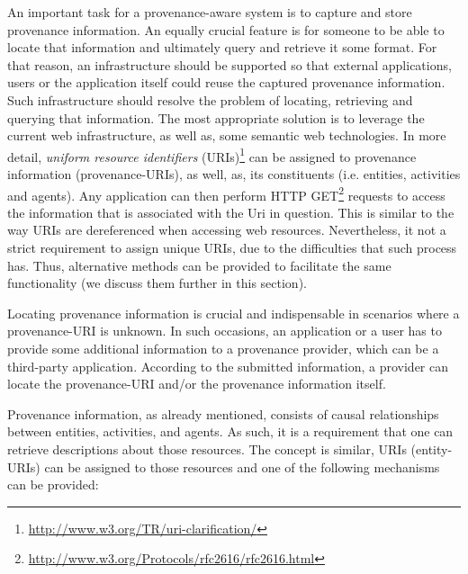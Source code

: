 An important task for a provenance-aware system is to capture and store provenance information. An equally crucial feature is for someone to be able  to locate that information and ultimately query and retrieve it some format\cite{reference35}.  For that reason, an infrastructure should be supported so that external applications, users or the application itself could reuse the captured provenance information. Such infrastructure should resolve the problem of locating, retrieving and querying that information. The most appropriate solution is to leverage the current web infrastructure, as well as, some semantic web technologies. In more detail, \emph{uniform resource identifiers} (URIs)\footnote{\url{http://www.w3.org/TR/uri-clarification/}} can be assigned to provenance information (provenance-URIs), as well, as, its constituents (i.e. entities, activities and agents). Any application can then perform HTTP GET\footnote{\url{http://www.w3.org/Protocols/rfc2616/rfc2616.html}} requests to access the information that is associated with the Uri in question\cite{prov-AQ}. This is similar to the way URIs are dereferenced when accessing web resources. Nevertheless, it not a strict requirement to assign unique URIs, due to the difficulties that such process has. Thus, alternative methods can be provided to facilitate the same functionality (we discuss them further in this section).

Locating provenance information is crucial and indispensable in scenarios where a provenance-URI is unknown. In such occasions, an application or a user has to provide some additional information to a provenance provider, which can be a third-party application. According to the submitted information, a provider can locate the provenance-URI and/or the provenance information itself.

Provenance information, as already mentioned, consists of causal relationships between entities, activities, and agents. As such, it is a requirement that one can retrieve descriptions about those resources. The concept is similar, URIs (entity-URIs) can be assigned to those resources and one of the following mechanisms can be provided:

